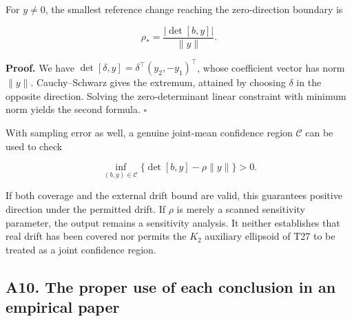 \documentclass[11pt,a4paper]{article}
\begin{document}
\par
\noindent\begin{minipage}{\linewidth}

For \(y\ne0\), the smallest reference change reaching the zero-direction
boundary is

\[
\rho_*=\frac{|\det[b,y]|}{\|y\|}.
\]

\end{minipage}\par

\textbf{Proof.} We have \(\det[\delta,y]=\delta^\top(y_2,-y_1)^\top\),
whose coefficient vector has norm \(\|y\|\). Cauchy–Schwarz gives the
extremum, attained by choosing \(\delta\) in the opposite direction.
Solving the zero-determinant linear constraint with minimum norm yields
the second formula. \(\square\)

\par
\noindent\begin{minipage}{\linewidth}

With sampling error as well, a genuine joint-mean confidence region
\(\mathcal C\) can be used to check

\[
\inf_{(b,y)\in\mathcal C}
\{\det[b,y]-\rho\|y\|\}>0.
\]

\end{minipage}\par

If both coverage and the external drift bound are valid, this guarantees
positive direction under the permitted drift. If \(\rho\) is merely a
scanned sensitivity parameter, the output remains a sensitivity
analysis. It neither establishes that real drift has been covered nor
permits the \(K_2\) auxiliary ellipsoid of T27 to be treated as a joint
confidence region.

\subsection{A10. The proper use of each conclusion in an empirical
paper}\label{a10.-the-proper-use-of-each-conclusion-in-an-empirical-paper}

\begingroup
\small
\end{document}
